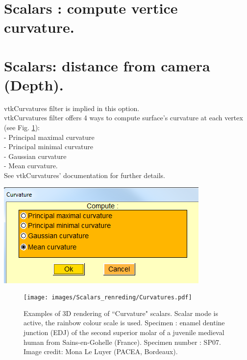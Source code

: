 \section{Scalars : compute vertice curvature.}
\section{Scalars: distance from camera (Depth).}
\noindent
\begin{minipage}{0.5\textwidth}
vtkCurvatures filter is implied in this option.\\
vtkCurvatures filter offers 4 ways to compute surface's
curvature at each vertex (see Fig. \ref{curvatures}):\\
- Principal maximal curvature\\
- Principal minimal curvature\\
- Gaussian curvature\\
- Mean curvature.\\
See vtkCurvatures' documentation for further details.

\end{minipage}    
\begin{minipage}{0.5\textwidth}\centering
  \includegraphics[scale=0.5]{images/Scalars_renreding/Curvature_window.png}
\label{curvature_window}
 \end{minipage} 
\noindent

\begin{figure}
  \centering
  \texttt{[image: images/Scalars\_renreding/Curvatures.pdf]} 
	\caption{
Examples of 3D rendering of ``Curvature" scalars. Scalar mode is active, the rainbow colour scale is used. Specimen : enamel dentine junction (EDJ) of the second superior molar of a juvenile medieval human from Sains-en-Gohelle (France). Specimen number : SP07. Image credit: Mona Le Luyer (PACEA, Bordeaux).}
\label{curvatures}
 
\end{figure}

